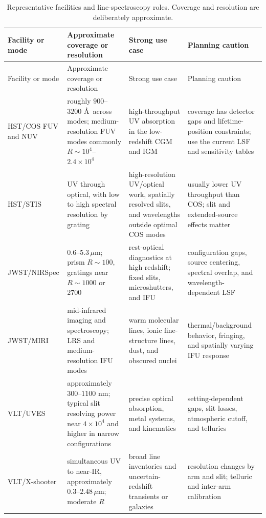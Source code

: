 \begin{longtable}{@{}p{}p{}p{}p{}@{}}
\caption{Representative facilities and line-spectroscopy roles.
Coverage and resolution are deliberately approximate.}
\label{tab:facility-map}\\
\toprule
Facility or mode & Approximate coverage or resolution & Strong use case &
Planning caution\\
\midrule
\endfirsthead
\toprule
Facility or mode & Approximate coverage or resolution & Strong use case &
Planning caution\\
\midrule
\endhead
HST/COS FUV and NUV &
roughly $900$--$3200$ \AA\ across modes; medium-resolution FUV modes commonly
$R\sim10^4$--$2.4\times10^4$ &
high-throughput UV absorption in the low-redshift CGM and IGM &
coverage has detector gaps and lifetime-position constraints; use the current
LSF and sensitivity tables \citep{COSHandbook2026}\\
\addlinespace
HST/STIS &
UV through optical, with low to high spectral resolution by grating &
high-resolution UV/optical work, spatially resolved slits, and wavelengths
outside optimal COS modes &
usually lower UV throughput than COS; slit and extended-source effects matter\\
\addlinespace
JWST/NIRSpec &
$0.6$--$5.3\,\mu$m; prism $R\sim100$, gratings near $R\sim1000$ or $2700$ &
rest-optical diagnostics at high redshift; fixed slits, microshutters, and IFU &
configuration gaps, source centering, spectral overlap, and wavelength-
dependent LSF \citep{NIRSpecDocs2026}\\
\addlinespace
JWST/MIRI &
mid-infrared imaging and spectroscopy; LRS and medium-resolution IFU modes &
warm molecular lines, ionic fine-structure lines, dust, and obscured nuclei &
thermal/background behavior, fringing, and spatially varying IFU response
\citep{MIRIDocs2026}\\
\addlinespace
VLT/UVES &
approximately $300$--$1100$ nm; typical slit resolving power near $4\times10^4$
and higher in narrow configurations &
precise optical absorption, metal systems, and kinematics &
setting-dependent gaps, slit losses, atmospheric cutoff, and tellurics
\citep{ESOInstrumentDocs2026}\\
\addlinespace
VLT/X-shooter &
simultaneous UV to near-IR, approximately $0.3$--$2.48\,\mu$m; moderate $R$ &
broad line inventories and uncertain-redshift transients or galaxies &
resolution changes by arm and slit; telluric and inter-arm calibration\\

\end{longtable}
